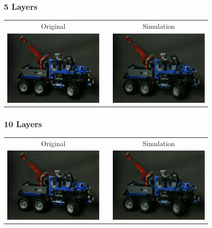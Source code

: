 \documentclass[12pt, compress]{beamer}
\begin{document}
\begin{frame}[fragile]
	\frametitle{5 Layers}
	
	\begin{center}
		\begin{tabular}{c p{0cm} c}
			Original & & Simulation \\
			\includegraphics[width = 5cm, trim={15cm, 10cm, 15cm, 10cm}, clip]{images/layers_and_projections/legotruck/original/08_08}
			& & \includegraphics[width = 5cm, trim={7.5cm, 5cm, 7.5cm, 5cm}, clip]{figures/simulated_views/legotruck/5Layers_legotruck/Reconstruction_of_view_(3,3)}
		\end{tabular}
	\end{center}
\end{frame}

\begin{frame}[fragile]
	\frametitle{10 Layers}
	
	\begin{center}
		\begin{tabular}{c p{0cm} c}
			Original & & Simulation \\
			\includegraphics[width = 5cm, trim={15cm, 10cm, 15cm, 10cm}, clip]{images/layers_and_projections/legotruck/original/08_08}
			& & \includegraphics[width = 5cm, trim={7.5cm, 5cm, 7.5cm, 5cm}, clip]{figures/simulated_views/legotruck/10Layers_legotruck/Reconstruction_of_view_(3,3)}
		\end{tabular}
	\end{center}
\end{frame}
\end{document}
